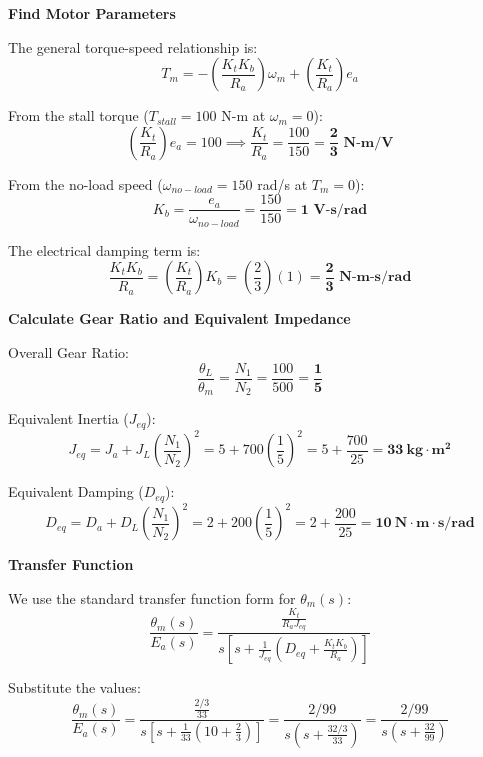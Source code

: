 \documentclass[11pt]{article}
\begin{document}
\vspace{5pt}
\noindent\textbf{Find Motor Parameters}

\vspace{5pt}
The general torque-speed relationship is:
\[
T_m = -\left(\frac{K_t K_b}{R_a}\right)\omega_m + \left(\frac{K_t}{R_a}\right)e_a
\]

\vspace{5pt}
{From the stall torque ($T_{stall} = 100$ N-m at $\omega_m = 0$):}
\[
\left(\frac{K_t}{R_a}\right)e_a = 100 \implies \frac{K_t}{R_a} = \frac{100}{150} = \mathbf{\frac{2}{3} \text{ N-m/V}}
\]

\vspace{5pt}
{From the no-load speed ($\omega_{no-load} = 150$ rad/s at $T_m = 0$):}
\[
K_b = \frac{e_a}{\omega_{no-load}} = \frac{150}{150} = \mathbf{1 \text{ V-s/rad}}
\]

\vspace{5pt}
{The electrical damping term is:}
\[
\frac{K_t K_b}{R_a} = \left(\frac{K_t}{R_a}\right)K_b = \left(\frac{2}{3}\right)(1) = \mathbf{\frac{2}{3} \text{ N-m-s/rad}}
\]

\vspace{5pt}
\noindent\textbf{Calculate Gear Ratio and Equivalent Impedance}

\vspace{5pt}
{Overall Gear Ratio:}
\[
\frac{\theta_L}{\theta_m} = \frac{N_1}{N_2} = \frac{100}{500} = \mathbf{\frac{1}{5}}
\]

\vspace{5pt}
{Equivalent Inertia ($J_{eq}$):}
\[
J_{eq} = J_a + J_L\left(\frac{N_1}{N_2}\right)^2
= 5 + 700\left(\frac{1}{5}\right)^2 = 5 + \frac{700}{25}
= \mathbf{33\ \text{kg}\cdot\text{m}^2}
\]

\vspace{5pt}
{Equivalent Damping ($D_{eq}$):}
\[
D_{eq} = D_a + D_L\left(\frac{N_1}{N_2}\right)^2
= 2 + 200\left(\frac{1}{5}\right)^2 = 2 + \frac{200}{25}
= \mathbf{10\ \text{N}\cdot\text{m}\cdot\text{s/rad}}
\]

\vspace{5pt}
\noindent\textbf{Transfer Function}

\vspace{5pt
}
We use the standard transfer function form for $\theta_m(s)$:
\[
\frac{\theta_m(s)}{E_a(s)} = \frac{\frac{K_t}{R_a J_{eq}}}
{s\left[s + \frac{1}{J_{eq}}\left(D_{eq} + \frac{K_t K_b}{R_a}\right)\right]}
\]

Substitute the values:
\[
\frac{\theta_m(s)}{E_a(s)} = \frac{\frac{2/3}{33}}{s\left[s + \frac{1}{33}\left(10 + \frac{2}{3}\right)\right]}
= \frac{2/99}{s\left(s + \frac{32/3}{33}\right)}
= \frac{2/99}{s\left(s + \frac{32}{99}\right)}
\]
\end{document}

